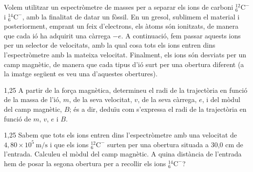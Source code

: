 Volem utilitzar un espectròmetre de masses per a separar els ions de carboni $^{12}_{6}\mathrm{C}^-$ i $^{14}_{6}\mathrm{C}^-$, amb la finalitat de datar un fòssil. En un gresol, sublimem el material i posteriorment, emprant un feix d'electrons, els àtoms són ionitzats, de manera que cada ió ha adquirit una càrrega $-e$. A continuació, fem passar aquests ions per un selector de velocitats, amb la qual cosa tots els ions entren dins l'espectròmetre amb la mateixa velocitat. Finalment, els ions són desviats per un camp magnètic, de manera que cada tipus d'ió surt per una obertura diferent (a la imatge següent es veu una d'aquestes obertures).


\begin{apartat}{1,25}
A partir de la força magnètica, determineu el radi de la trajectòria en funció de la massa de l'ió, $m$, de la seva velocitat, $v$, de la seva càrrega, $e$, i del mòdul del camp magnètic, $B$; és a dir, deduïu com s'expressa el radi de la trajectòria en funció de $m$, $v$, $e$ i $B$.
\end{apartat}

\begin{apartat}{1,25}
Sabem que tots els ions entren dins l'espectròmetre amb una velocitat de $4,80\times 10^5\ \mathrm{m/s}$ i que els ions $^{12}_{6}\mathrm{C}^-$ surten per una obertura situada a 30,0 cm de l'entrada. Calculeu el mòdul del camp magnètic. A quina distància de l'entrada hem de posar la segona obertura per a recollir els ions $^{14}_{6}\mathrm{C}^-$?
\end{apartat}


